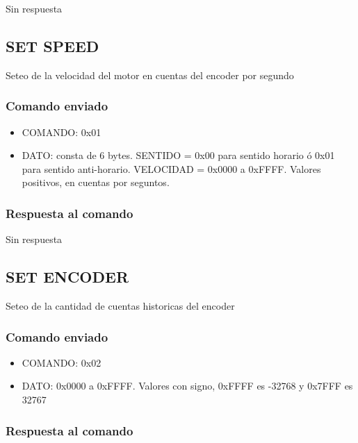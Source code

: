 \documentclass[a4paper,11pt]{article}
\begin{document}
Sin respuesta

\subsection{SET SPEED}
\label{set_speed}

Seteo de la velocidad del motor en cuentas del encoder por segundo

\subsubsection*{Comando enviado}
\label{set_speed_comando_enviado}

\begin{itemize}
	\item{COMANDO:} 0x01
	\item{DATO:} consta de 6 bytes.
		SENTIDO = 0x00 para sentido horario \'o 0x01 para sentido anti-horario.
		VELOCIDAD = 0x0000 a 0xFFFF. Valores positivos, en cuentas por seguntos.
\end{itemize}

\subsubsection*{Respuesta al comando}
\label{set_speed_respuesta}

Sin respuesta

\subsection{SET ENCODER}
\label{set_encoder}

Seteo de la cantidad de cuentas historicas del encoder

\subsubsection*{Comando enviado}
\label{set_encoder_comando_enviado}

\begin{itemize}
	\item{COMANDO:} 0x02
	\item{DATO:} 0x0000 a 0xFFFF. Valores con signo, 0xFFFF es -32768 y 0x7FFF es 32767
\end{itemize}

\subsubsection*{Respuesta al comando}
\label{set_encoder_respuesta}
\end{document}
